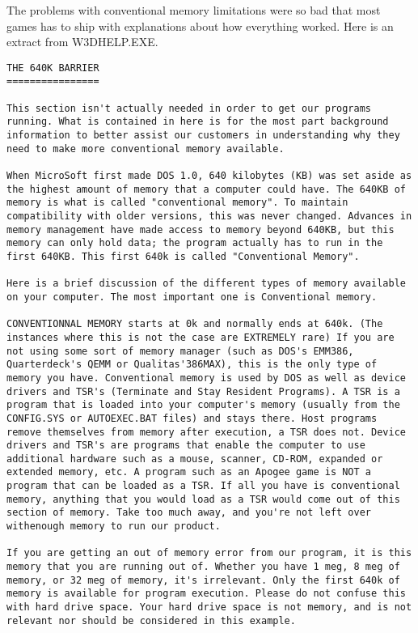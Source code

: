 \documentclass[book.tex]{subfiles}
\begin{document}
The problems with conventional memory limitations were so bad that most games has to ship with explanations about how everything worked. Here is an extract from W3DHELP.EXE.\\

 
   \begin{lstlisting}[breaklines=true,breakindent=0em]
THE 640K BARRIER
================

This section isn't actually needed in order to get our programs running. What is contained in here is for the most part background information to better assist our customers in understanding why they need to make more conventional memory available.

When MicroSoft first made DOS 1.0, 640 kilobytes (KB) was set aside as the highest amount of memory that a computer could have. The 640KB of memory is what is called "conventional memory". To maintain compatibility with older versions, this was never changed. Advances in memory management have made access to memory beyond 640KB, but this memory can only hold data; the program actually has to run in the first 640KB. This first 640k is called "Conventional Memory".

Here is a brief discussion of the different types of memory available on your computer. The most important one is Conventional memory.

CONVENTIONNAL MEMORY starts at 0k and normally ends at 640k. (The instances where this is not the case are EXTREMELY rare) If you are not using some sort of memory manager (such as DOS's EMM386, Quarterdeck's QEMM or Qualitas'386MAX), this is the only type of memory you have. Conventional memory is used by DOS as well as device drivers and TSR's (Terminate and Stay Resident Programs). A TSR is a program that is loaded into your computer's memory (usually from the CONFIG.SYS or AUTOEXEC.BAT files) and stays there. Host programs remove themselves from memory after execution, a TSR does not. Device drivers and TSR's are programs that enable the computer to use additional hardware such as a mouse, scanner, CD-ROM, expanded or extended memory, etc. A program such as an Apogee game is NOT a program that can be loaded as a TSR. If all you have is conventional memory, anything that you would load as a TSR would come out of this section of memory. Take too much away, and you're not left over withenough memory to run our product. 

If you are getting an out of memory error from our program, it is this memory that you are running out of. Whether you have 1 meg, 8 meg of memory, or 32 meg of memory, it's irrelevant. Only the first 640k of memory is available for program execution. Please do not confuse this with hard drive space. Your hard drive space is not memory, and is not relevant nor should be considered in this example.


\end{lstlisting}
\end{document}
